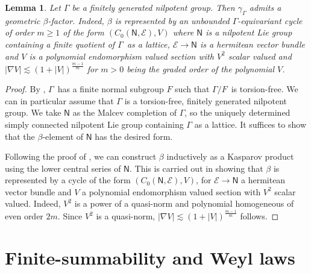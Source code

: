 \documentclass[a4paper,reqno]{amsart}
\numberwithin{equation}{section}
\newtheorem{lemma}[thm]{Lemma}
\theoremstyle{definition}
\theoremstyle{remark}
\begin{document}
\begin{lemma}
\label{lemaodknaldn}
Let $\Gamma$ be a finitely generated nilpotent group. Then $\gamma_\Gamma$ admits a geometric $\beta$-factor. Indeed, $\beta$ is represented by an unbounded $\Gamma$-equivariant cycle of order $m\geq 1$ of the form $(C_0(\mathsf{N},\mathcal{E}),V)$ where $\mathsf{N}$ is a nilpotent Lie group containing a finite quotient of $\Gamma$ as a lattice, $\mathcal{E}\to \mathsf{N}$ is a hermitean vector bundle and $V$ is a polynomial endomorphism valued section with $V^2$ scalar valued and $|\nabla V|\lesssim (1+|V|)^{\frac{m-1}{m}}$ for $m>0$ being the graded order of the polynomial $V$. 
\end{lemma}




\begin{proof}
By \cite[Theorem 5.2.7]{crusoe}, $\Gamma$ has a finite normal subgroup $F$ such that $\Gamma/F$ is torsion-free. We can in particular assume that $\Gamma$ is a torsion-free, finitely generated nilpotent group. We take $\mathsf{N}$ as the Malcev completion of $\Gamma$, so the uniquely determined simply connected nilpotent Lie group containing $\Gamma$ as a lattice. It suffices to show that the $\beta$-element of $\mathsf{N}$ has the desired form. 

Following the proof of \cite[Theorem 5.7]{kaspinv}, we can construct $\beta$ inductively as a Kasparov product using the lower central series of $\mathsf{N}$. This is carried out in \cite[Section 7]{FGM} showing that $\beta$ is represented by a cycle of the form $(C_0(\mathsf{N},\mathcal{E}),V)$, for $\mathcal{E}\to \mathsf{N}$ a hermitean vector bundle and $V$ a polynomial endomorphism valued section with $V^2$ scalar valued. Indeed, $V^2$ is a power of a quasi-norm and polynomial homogeneous of even order $2m$. Since $V^2$ is a quasi-norm, $|\nabla V|\lesssim (1+|V|)^{\frac{m-1}{m}}$ follows.
\end{proof}



\section{Finite-summability and Weyl laws}
\label{alkdnaldn}
\end{document}
